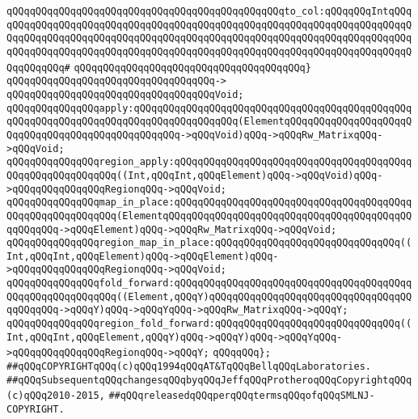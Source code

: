 \verb|qQQqqQQqqQQqqQQqqQQqqQQqqQQqqQQqqQQqqQQqqQQqqQQqto_col:qQQqqQQqIntqQQqqQQqqQQqqQQqqQQqqQQqqQQqqQQqqQQqqQQqqQQqqQQqqQQqqQQqqQQqqQQqqQQqqQQqqQQqqQQqqQQqqQQqqQQqqQQqqQQqqQQqqQQqqQQqqQQqqQQqqQQqqQQqqQQqqQQqqQQqqQQqqQQqqQQqqQQqqQQqqQQqqQQqqQQqqQQqqQQqqQQqqQQqqQQqqQQqqQQqqQQqqQQqqQQqqQQqqQQqqQQq#|\newline
\verb|qQQqqQQqqQQqqQQqqQQqqQQqqQQqqQQqqQQqqQQq}|\newline
\verb|qQQqqQQqqQQqqQQqqQQqqQQqqQQqqQQqqQQq->|\newline
\verb|qQQqqQQqqQQqqQQqqQQqqQQqqQQqqQQqqQQqVoid;|\newline
\newline
\verb|qQQqqQQqqQQqqQQqapply:qQQqqQQqqQQqqQQqqQQqqQQqqQQqqQQqqQQqqQQqqQQqqQQqqQQqqQQqqQQqqQQqqQQqqQQqqQQqqQQqqQQqqQQq(ElementqQQqqQQqqQQqqQQqqQQqqQQqqQQqqQQqqQQqqQQqqQQqqQQqqQQq->qQQqVoid)qQQq->qQQqRw_MatrixqQQq->qQQqVoid;|\newline
\verb|qQQqqQQqqQQqqQQqregion_apply:qQQqqQQqqQQqqQQqqQQqqQQqqQQqqQQqqQQqqQQqqQQqqQQqqQQqqQQqqQQq((Int,qQQqInt,qQQqElement)qQQq->qQQqVoid)qQQq->qQQqqQQqqQQqqQQqRegionqQQq->qQQqVoid;|\newline
\newline
\verb|qQQqqQQqqQQqqQQqmap_in_place:qQQqqQQqqQQqqQQqqQQqqQQqqQQqqQQqqQQqqQQqqQQqqQQqqQQqqQQqqQQq(ElementqQQqqQQqqQQqqQQqqQQqqQQqqQQqqQQqqQQqqQQqqQQqqQQqqQQq->qQQqElement)qQQq->qQQqRw_MatrixqQQq->qQQqVoid;|\newline
\verb|qQQqqQQqqQQqqQQqregion_map_in_place:qQQqqQQqqQQqqQQqqQQqqQQqqQQqqQQq((Int,qQQqInt,qQQqElement)qQQq->qQQqElement)qQQq->qQQqqQQqqQQqqQQqRegionqQQq->qQQqVoid;|\newline
\newline
\verb|qQQqqQQqqQQqqQQqfold_forward:qQQqqQQqqQQqqQQqqQQqqQQqqQQqqQQqqQQqqQQqqQQqqQQqqQQqqQQqqQQq((Element,qQQqY)qQQqqQQqqQQqqQQqqQQqqQQqqQQqqQQqqQQqqQQqqQQq->qQQqY)qQQq->qQQqYqQQq->qQQqRw_MatrixqQQq->qQQqY;|\newline
\verb|qQQqqQQqqQQqqQQqregion_fold_forward:qQQqqQQqqQQqqQQqqQQqqQQqqQQqqQQq((Int,qQQqInt,qQQqElement,qQQqY)qQQq->qQQqY)qQQq->qQQqYqQQq->qQQqqQQqqQQqqQQqRegionqQQq->qQQqY;|\newline
\verb|qQQqqQQq};|\newline
\newline
\newline
\verb|##qQQqCOPYRIGHTqQQq(c)qQQq1994qQQqAT&TqQQqBellqQQqLaboratories.|\newline
\verb|##qQQqSubsequentqQQqchangesqQQqbyqQQqJeffqQQqProtheroqQQqCopyrightqQQq(c)qQQq2010-2015,|\newline
\verb|##qQQqreleasedqQQqperqQQqtermsqQQqofqQQqSMLNJ-COPYRIGHT.|\newline


